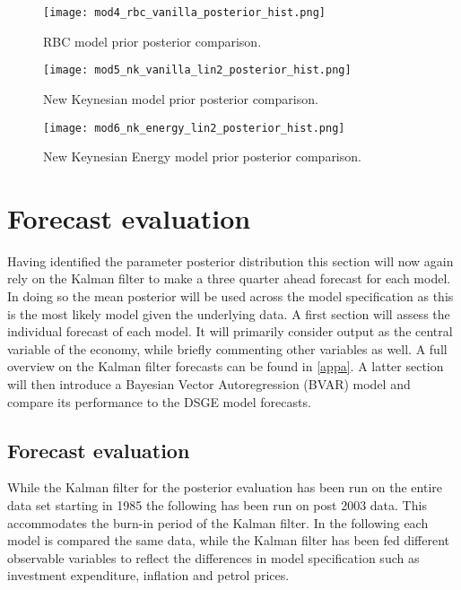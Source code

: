 \documentclass[12pt,a4paper,english]{article} %
\let\oldsection\section
\renewcommand\section{\clearpage\oldsection}
\begin{document}
	\begin{figure}[h]
		\begin{center}
			\texttt{[image: mod4\_rbc\_vanilla\_posterior\_hist.png]}
			\caption{RBC model prior posterior comparison.}\label{fig:rbcpp}
		\end{center}
	\end{figure}
	\begin{figure}[h]
		\begin{center}
			\texttt{[image: mod5\_nk\_vanilla\_lin2\_posterior\_hist.png]}
			\caption{New Keynesian model prior posterior comparison.}\label{fig:nk5pp}
		\end{center}
	\end{figure}
	\begin{figure}[h]
		\begin{center}
			\texttt{[image: mod6\_nk\_energy\_lin2\_posterior\_hist.png]}
			\caption{New Keynesian Energy model prior posterior comparison.}\label{fig:nk6pp}
		\end{center}
	\end{figure}
	\pagebreak
		


	
	
	
	
	\section{Forecast evaluation}
	Having identified the parameter posterior distribution this section will now again rely on the Kalman filter to make a three quarter ahead forecast for each model. In doing so the mean posterior will be used across the model specification as this is the most likely model given the underlying data.
	A first section will assess the individual forecast of each model. It will primarily consider output as the central variable of the economy, while briefly commenting other variables as well. A full overview on the Kalman filter forecasts can be found in \ref{appa}. 	
	A latter section will then introduce a Bayesian Vector Autoregression (BVAR) model and compare its performance to the DSGE model forecasts.
	
	\subsection{Forecast evaluation}
	While the Kalman filter for the posterior evaluation has been run on the entire data set starting in 1985 the following has been run on post 2003 data. This accommodates the burn-in period of the Kalman filter. In the following each model is compared the same data, while the Kalman filter has been fed different observable variables to reflect the differences in model specification such as investment expenditure, inflation and petrol prices. 
	
\end{document}
